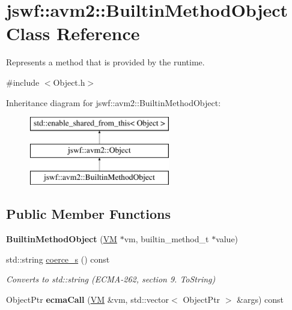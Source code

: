 \hypertarget{classjswf_1_1avm2_1_1_builtin_method_object}{\section{jswf\+:\+:avm2\+:\+:Builtin\+Method\+Object Class Reference}
\label{classjswf_1_1avm2_1_1_builtin_method_object}
}


Represents a method that is provided by the runtime.  




{\ttfamily \#include $<$Object.\+h$>$}

Inheritance diagram for jswf\+:\+:avm2\+:\+:Builtin\+Method\+Object\+:\begin{figure}[H]
\begin{center}
\leavevmode
\includegraphics[height=3.000000cm]{classjswf_1_1avm2_1_1_builtin_method_object}
\end{center}
\end{figure}
\subsection*{Public Member Functions}
\begin{DoxyCompactItemize}
\item 
\hypertarget{classjswf_1_1avm2_1_1_builtin_method_object_a9dd3103382877771acf7e4832c9c428c}{{\bfseries Builtin\+Method\+Object} (\hyperlink{classjswf_1_1avm2_1_1_v_m}{V\+M} $\ast$vm, builtin\+\_\+method\+\_\+t $\ast$value)}\label{classjswf_1_1avm2_1_1_builtin_method_object_a9dd3103382877771acf7e4832c9c428c}

\item 
std\+::string \hyperlink{classjswf_1_1avm2_1_1_builtin_method_object_abd0021d91244a730a9275d1e690eed95}{coerce\+\_\+s} () const 
\begin{DoxyCompactList}\small\item\em Converts to {\ttfamily std\+::string} (E\+C\+M\+A-\/262, section 9. {\itshape To\+String}) \end{DoxyCompactList}\item 
\hypertarget{classjswf_1_1avm2_1_1_builtin_method_object_a76932e02bf47d2ca46bdf702d540d3f1}{Object\+Ptr {\bfseries ecma\+Call} (\hyperlink{classjswf_1_1avm2_1_1_v_m}{V\+M} \&vm, std\+::vector$<$ Object\+Ptr $>$ \&args) const }\label{classjswf_1_1avm2_1_1_builtin_method_object_a76932e02bf47d2ca46bdf702d540d3f1}

\end{DoxyCompactItemize}
